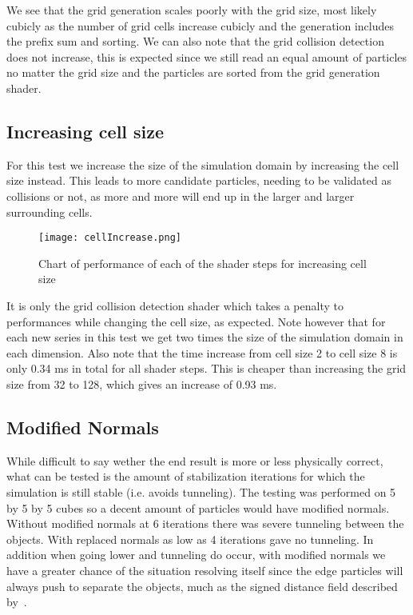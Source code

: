 We see that the grid generation scales poorly with the grid size, most likely cubicly
as the number of grid cells increase cubicly and the generation includes the prefix sum and sorting.
We can also note that the grid collision detection does not increase, this is expected since
we still read an equal amount of particles no matter the grid size and the particles are
sorted from the grid generation shader.

\subsection{Increasing cell size}
For this test we increase the size of the simulation domain by increasing the cell size instead.
This leads to more candidate particles, needing to be validated as collisions or not,
as more and more will end up in
the larger and larger surrounding cells.
\begin{figure}[H]
  \centering
  \texttt{[image: cellIncrease.png]}
  \caption{Chart of performance of each of the shader steps for increasing cell size}
\end{figure}

It is only the grid collision detection shader which takes a penalty to performances
while changing the cell size, as expected. Note however that for each new series
in this test we get two times the size of the simulation domain in each dimension.
Also note that the time increase from cell size 2 to cell size 8 is only 0.34 ms in total for all shader steps.
This is cheaper than increasing the grid size from 32 to 128, which gives an increase of 0.93 ms.

\subsection{Modified Normals}
While difficult to say wether the end result is more or less physically correct,
what can be tested is the amount of stabilization iterations for which the simulation
is still stable (i.e. avoids tunneling). The testing was performed on 5 by 5 by 5
cubes so a decent amount of particles would have modified normals. Without modified
normals at 6 iterations there was severe tunneling between the objects. With replaced normals
 as low as 4 iterations gave no tunneling. In addition when going lower
 and tunneling do occur, with modified normals we have a greater chance of the
 situation resolving itself since the edge particles will always push to separate
 the objects, much as the signed distance field described by~\cite{flex}.

